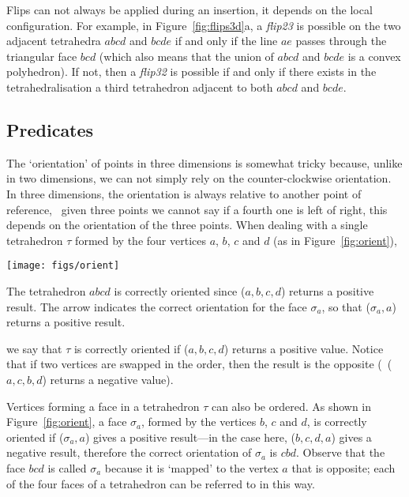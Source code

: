 Flips can not always be applied during an insertion, it depends on the local configuration.
For example, in Figure~\ref{fig:flips3d}a, a \emph{flip23} is possible on the two adjacent tetrahedra $abcd$ and $bcde$ if and only if the line $ae$ passes through the triangular face $bcd$ (which also means that the union of $abcd$ and $bcde$ is a convex polyhedron). 
If not, then a \emph{flip32} is possible if and only if there exists in the tetrahedralisation a third tetrahedron adjacent to both $abcd$ and $bcde$.



\subsection{Predicates}

The `orientation' of points in three dimensions is somewhat tricky because, unlike in two dimensions, we can not simply rely on the counter-clockwise orientation. 
In three dimensions, the orientation is always relative to another point of reference, \ie\ given three points we cannot say if a fourth one is left of right, this depends on the orientation of the three points.
When dealing with a single tetrahedron $\tau$ formed by the four vertices $a$, $b$, $c$ and $d$ (as in Figure~\ref{fig:orient}), 
\begin{marginfigure}
  \centering
  \texttt{[image: figs/orient]}
  \caption{The tetrahedron $abcd$ is correctly oriented since \Orient($a,b,c,d$) returns a positive result. The arrow indicates the correct orientation for the face $\sigma_a$, so that \Orient($\sigma_a,a$) returns a positive result.}%
\label{fig:orient}
\end{marginfigure}
we say that $\tau$ is correctly oriented if \Orient($a,b,c,d$) returns a positive value. 
Notice that if two vertices are swapped in the order, then the result is the opposite (\ie\ \Orient($a,c,b,d$) returns a negative value). 

Vertices forming a face in a tetrahedron $\tau$ can also be ordered. 
As shown in Figure~\ref{fig:orient}, a face $\sigma_a$, formed by the vertices $b$, $c$ and $d$, is correctly oriented if \Orient($\sigma_a,a$) gives a positive result---in the case here, \Orient($b,c,d,a$) gives a negative result, therefore the correct orientation of $\sigma_a$ is $cbd$. Observe that the face $bcd$ is called $\sigma_a$ because it is `mapped' to the vertex $a$ that is opposite; each of the four faces of a tetrahedron can be referred to in this way.

